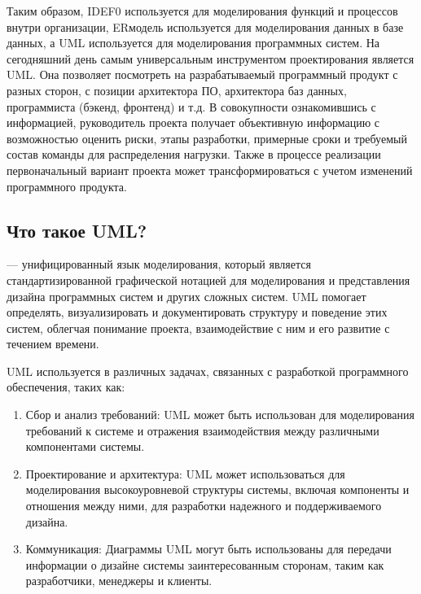 \documentclass[letterpaper,10pt,russian]{sphinxmanual}
\begin{document}
\sphinxAtStartPar
Таким образом, IDEF0 используется для моделирования функций и процессов внутри организации, ER\sphinxhyphen{}модель используется для моделирования данных в базе данных, а UML используется для моделирования программных систем. На сегодняшний день самым универсальным инструментом проектирования является UML. Она позволяет посмотреть на разрабатываемый программный продукт с разных сторон, с позиции архитектора ПО, архитектора баз данных, программиста (бэкенд, фронтенд) и т.д.
В совокупности ознакомившись с информацией, руководитель проекта получает объективную информацию с возможностью оценить риски, этапы разработки, примерные сроки и требуемый состав команды для распределения нагрузки. Также в процессе реализации первоначальный вариант проекта может трансформироваться с учетом изменений программного продукта.


\subsection{Что такое UML?}
\label{\detokenize{educational_materials/uml/content:uml}}
\sphinxAtStartPar
{}  — унифицированный язык моделирования, который является стандартизированной графической нотацией для моделирования и представления дизайна программных систем и других сложных систем. UML помогает определять, визуализировать и документировать структуру и поведение этих систем, облегчая понимание проекта, взаимодействие с ним и его развитие с течением времени.

\sphinxAtStartPar
{}

\sphinxAtStartPar
UML используется в различных задачах, связанных с разработкой программного обеспечения, таких как:
\begin{enumerate}
%
\item {} 
\sphinxAtStartPar
Сбор и анализ требований: UML может быть использован для моделирования требований к системе и отражения взаимодействия между различными компонентами системы.

\item {} 
\sphinxAtStartPar
Проектирование и архитектура: UML может использоваться для моделирования высокоуровневой структуры системы, включая компоненты и отношения между ними, для разработки надежного и поддерживаемого дизайна.

\item {} 
\sphinxAtStartPar
Коммуникация: Диаграммы UML могут быть использованы для передачи информации о дизайне системы заинтересованным сторонам, таким как разработчики, менеджеры и клиенты.

\end{enumerate}
\end{document}
